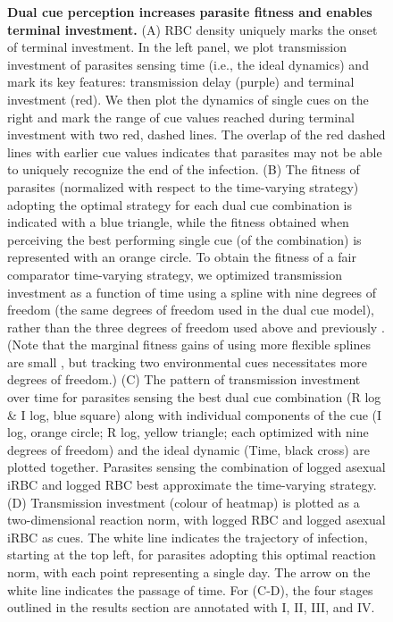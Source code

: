 \documentclass[10pt,letterpaper]{article}
\begin{document}
\begin{figure}
\caption{{\bf Dual cue perception increases parasite fitness and enables terminal investment.}
(A) RBC density uniquely marks the onset of terminal investment. In the left panel, we plot transmission investment of parasites sensing time (i.e., the ideal dynamics) and mark its key features: transmission delay (purple) and terminal investment (red). We then plot the dynamics of single cues on the right and mark the range of cue values reached during terminal investment with two red, dashed lines. The overlap of the red dashed lines with earlier cue values indicates that parasites may not be able to uniquely recognize the end of the infection. (B) The fitness of parasites (normalized with respect to the time-varying strategy) adopting the optimal strategy for each dual cue combination is indicated with a blue triangle, while the fitness obtained when perceiving the best performing single cue (of the combination) is represented with an orange circle. To obtain the fitness of a fair comparator time-varying strategy, we optimized transmission investment as a function of time using a spline with nine degrees of freedom (the same degrees of freedom used in the dual cue model), rather than the three degrees of freedom used above and previously \cite{greischar_predicting_2016}. (Note that the marginal fitness gains of using more flexible splines are small \cite{greischar_predicting_2016}, but tracking two environmental cues necessitates more degrees of freedom.) (C) The pattern of transmission investment over time for parasites sensing the best dual cue combination (R log \& I log, blue square) along with individual components of the cue (I log, orange circle; R log, yellow triangle; each optimized with nine degrees of freedom) and the ideal dynamic (Time, black cross) are plotted together. Parasites sensing the combination of logged asexual iRBC and logged RBC best approximate the time-varying strategy. (D) Transmission investment (colour of heatmap) is plotted as a two-dimensional reaction norm, with logged RBC and logged asexual iRBC as cues. The white line indicates the trajectory of infection, starting at the top left, for parasites adopting this optimal reaction norm, with each point representing a single day. The arrow on the white line indicates the passage of time. For (C-D), the four stages outlined in the results section are annotated with I, II, III, and IV.}
\label{fig3}
\end{figure}
\end{document}
